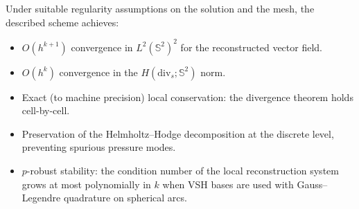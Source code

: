 Under suitable regularity assumptions on the solution and the mesh, the
described scheme achieves:
\begin{itemize}[nosep]
  \item $O(h^{k+1})$ convergence in $L^2(\mathbb{S}^2)^2$ for the
        reconstructed vector field.
  \item $O(h^k)$ convergence in the $H(\mathrm{div}_s;\mathbb{S}^2)$ norm.
  \item Exact (to machine precision) local conservation: the divergence
        theorem holds cell-by-cell.
  \item Preservation of the Helmholtz--Hodge decomposition at the discrete
        level, preventing spurious pressure modes.
  \item $p$-robust stability: the condition number of the local reconstruction
        system grows at most polynomially in $k$ when VSH bases are used
        with Gauss--Legendre quadrature on spherical arcs.
\end{itemize}
%
%
%
%
%
%
